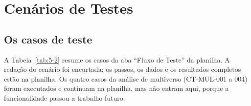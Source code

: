
\section{Cenários de Testes}\label{sec:5-2}

\subsection{Os casos de teste}\label{sec:5-2-1}

A Tabela~\ref{tab:5-2} resume os casos da aba ``Fluxo de Teste'' da planilha. A redação do cenário foi encurtada; os passos, os dados e os resultados completos estão na planilha. Os quatro casos da análise de multiverso (CT-MUL-001 a 004) foram executados e continuam na planilha, mas não entram aqui, porque a funcionalidade passou a trabalho futuro.

